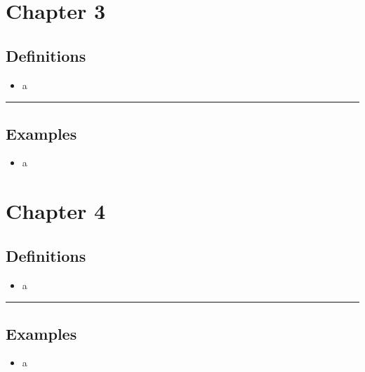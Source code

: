 \documentclass[12pt]{article}
\begin{document}

\newpage
\section{Chapter 3}

\subsection{Definitions}
\begin{itemize}
    \item a
\end{itemize}
\noindent\rule{\linewidth}{1pt}

\subsection{Examples}
\begin{itemize}
    \item a
\end{itemize}


\newpage
\section{Chapter 4}

\subsection{Definitions}
\begin{itemize}
    \item a
\end{itemize}
\noindent\rule{\linewidth}{1pt}

\subsection{Examples}
\begin{itemize}
    \item a
\end{itemize}
\end{document}
